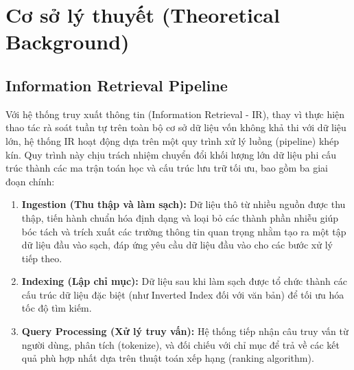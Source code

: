 \chapter{Cơ sở lý thuyết (Theoretical Background)}

\section{Information Retrieval Pipeline}
Với hệ thống truy xuất thông tin (Information Retrieval - IR), thay vì thực hiện thao tác rà soát tuần tự trên toàn bộ cơ sở dữ liệu vốn không khả thi với dữ liệu lớn, hệ thống IR hoạt động dựa trên một quy trình xử lý luồng (pipeline) khép kín. Quy trình này chịu trách nhiệm chuyển đổi khối lượng lớn dữ liệu phi cấu trúc thành các ma trận toán học và cấu trúc lưu trữ tối ưu, bao gồm ba giai đoạn chính:
\begin{enumerate}
    \item \textbf{Ingestion (Thu thập và làm sạch):} Dữ liệu thô từ nhiều nguồn được thu thập, tiến hành chuẩn hóa định dạng và loại bỏ các thành phần nhiễu giúp bóc tách và trích xuất các trường thông tin quan trọng nhằm tạo ra một tập dữ liệu đầu vào sạch, đáp ứng yêu cầu dữ liệu đầu vào cho các bước xử lý tiếp theo.
    \item \textbf{Indexing (Lập chỉ mục):} Dữ liệu sau khi làm sạch được tổ chức thành các cấu trúc dữ liệu đặc biệt (như Inverted Index đối với văn bản) để tối ưu hóa tốc độ tìm kiếm.
    \item \textbf{Query Processing (Xử lý truy vấn):} Hệ thống tiếp nhận câu truy vấn từ người dùng, phân tích (tokenize), và đối chiếu với chỉ mục để trả về các kết quả phù hợp nhất dựa trên thuật toán xếp hạng (ranking algorithm).
\end{enumerate}

